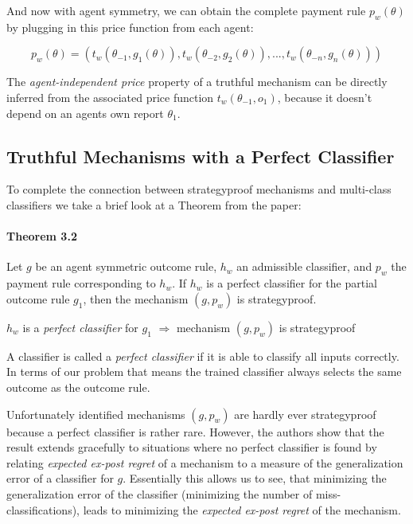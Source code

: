 \documentclass[]{article}
\begin{document}
\noindent And now with agent symmetry, we can obtain the complete payment rule $p_{w}(\theta)$ by plugging in this price function from each agent:

\begin{equation*}
p_{w}(\theta) = (t_{w}(\theta_{-1},g_{1}(\theta)), t_{w}(\theta_{-2},g_{2}(\theta)),..., t_{w}(\theta_{-n},g_{n}(\theta)))
\end{equation*}

\noindent The \emph{agent-independent price} property of a truthful mechanism can be directly inferred from the associated price function $t_{w}(\theta_{-1}, o_{1})$, because it doesn't depend on an agents own report $\theta_{1}$.

\newpage
\subsection{Truthful Mechanisms with a Perfect Classifier}
To complete the connection between strategyproof mechanisms and multi-class classifiers we take a brief look at a Theorem from the paper:

\paragraph{Theorem 3.2}  Let $g$ be an agent symmetric outcome rule, $h_{w}$ an admissible classifier, and $p_{w}$ the payment rule corresponding to $h_{w}$. If $h_{w}$ is a perfect classifier for the partial outcome rule $g_{1}$, then the mechanism $(g,p_{w})$ is strategyproof.

\begin{center}
	$h_{w}$ is a \emph{perfect classifier} for $g_{1}$ $\Rightarrow$ mechanism $(g,p_{w})$ is strategyproof
\end{center}

\noindent A classifier is called a \emph{perfect classifier} if it is able to classify all inputs correctly. In terms of our problem that means the trained classifier always selects the same outcome as the outcome rule.

\noindent Unfortunately identified mechanisms $(g,p_{w})$ are hardly ever strategyproof because a perfect classifier is rather rare. 
However, the authors show that the result extends gracefully to situations where no perfect classifier is found by relating \emph{expected ex-post regret} of a mechanism to a measure of the generalization error of a classifier for $g$. Essentially this allows us to see, that minimizing the generalization error of the classifier (minimizing the number of miss-classifications), leads to minimizing the \emph{expected ex-post regret} of the mechanism.
\end{document}

